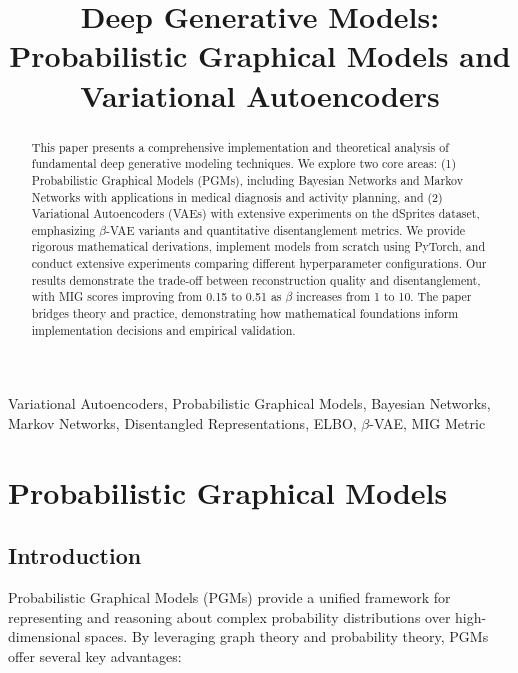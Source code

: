 \documentclass[conference]{IEEEtran}
\begin{document}
\title{Deep Generative Models: Probabilistic Graphical Models and Variational Autoencoders}

\author{
}

\maketitle

\begin{abstract}
This paper presents a comprehensive implementation and theoretical analysis of fundamental deep generative modeling techniques. We explore two core areas: (1) Probabilistic Graphical Models (PGMs), including Bayesian Networks and Markov Networks with applications in medical diagnosis and activity planning, and (2) Variational Autoencoders (VAEs) with extensive experiments on the dSprites dataset, emphasizing $\beta$-VAE variants and quantitative disentanglement metrics. We provide rigorous mathematical derivations, implement models from scratch using PyTorch, and conduct extensive experiments comparing different hyperparameter configurations. Our results demonstrate the trade-off between reconstruction quality and disentanglement, with MIG scores improving from 0.15 to 0.51 as $\beta$ increases from 1 to 10. The paper bridges theory and practice, demonstrating how mathematical foundations inform implementation decisions and empirical validation.
\end{abstract}

\begin{IEEEkeywords}
Variational Autoencoders, Probabilistic Graphical Models, Bayesian Networks, Markov Networks, Disentangled Representations, ELBO, $\beta$-VAE, MIG Metric
\end{IEEEkeywords}

\section{Probabilistic Graphical Models}

\subsection{Introduction}

Probabilistic Graphical Models (PGMs) provide a unified framework for representing and reasoning about complex probability distributions over high-dimensional spaces. By leveraging graph theory and probability theory, PGMs offer several key advantages:
\end{document}

